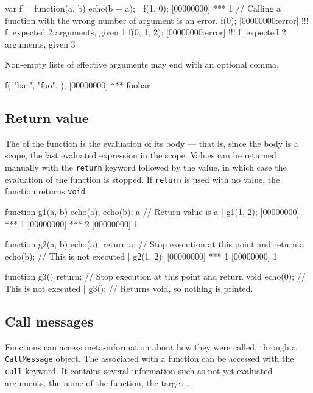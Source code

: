 \begin{urbiscript}[firstnumber=last]
var f = function(a, b) {
  echo(b + a);
}|
f(1, 0);
[00000000] *** 1
// Calling a function with the wrong number of argument is an error.
f(0);
[00000000:error] !!! f: expected 2 arguments, given 1
f(0, 1, 2);
[00000000:error] !!! f: expected 2 arguments, given 3
\end{urbiscript}

Non-empty lists of effective arguments may end with an optional comma.
\begin{urbiscript}[firstnumber=last]
f(
  "bar",
  "foo",
 );
[00000000] *** foobar
\end{urbiscript}


\subsection{Return value}

The  of the function is the
evaluation of its body --- that is, since the body is a scope, the
last evaluated expression in the scope.  Values can be returned
manually with the \lstinline|return| keyword followed by the value, in
which case the evaluation of the function is stopped. If
\lstinline|return| is used with no value, the function returns
\lstinline|void|.

\begin{urbiscript}[firstnumber=last]
function g1(a, b)
{
  echo(a);
  echo(b);
  a // Return value is a
}|
g1(1, 2);
[00000000] *** 1
[00000000] *** 2
[00000000] 1

function g2(a, b)
{
  echo(a);
  return a; // Stop execution at this point and return a
  echo(b); // This is not executed
}|
g2(1, 2);
[00000000] *** 1
[00000000] 1

function g3()
{
  return; // Stop execution at this point and return void
  echo(0); // This is not executed
}|
g3(); // Returns void, so nothing is printed.
\end{urbiscript}

\subsection{Call messages}
\label{sec:us-fun-callmsg}

Functions can access meta-information about how they were called,
through a \lstinline|CallMessage| object. The 
associated with a function can be accessed with the \lstinline|call|
keyword. It contains several information such as not-yet evaluated
arguments, the name of the function, the target \ldots

